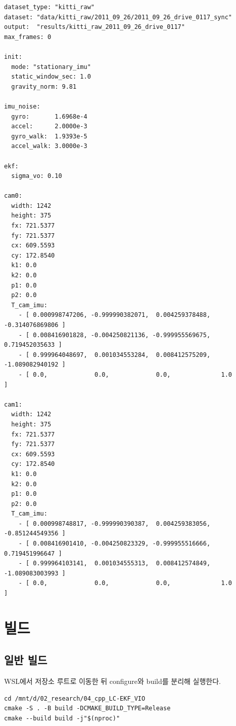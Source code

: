 \documentclass[11pt,a4paper,oneside]{report}
\begin{document}
\begin{lstlisting}[style=yaml,caption={저장소 루트 실행 기준 최소 예시}]
dataset_type: "kitti_raw"
dataset: "data/kitti_raw/2011_09_26/2011_09_26_drive_0117_sync"
output:  "results/kitti_raw_2011_09_26_drive_0117"
max_frames: 0

init:
  mode: "stationary_imu"
  static_window_sec: 1.0
  gravity_norm: 9.81

imu_noise:
  gyro:       1.6968e-4
  accel:      2.0000e-3
  gyro_walk:  1.9393e-5
  accel_walk: 3.0000e-3

ekf:
  sigma_vo: 0.10

cam0:
  width: 1242
  height: 375
  fx: 721.5377
  fy: 721.5377
  cx: 609.5593
  cy: 172.8540
  k1: 0.0
  k2: 0.0
  p1: 0.0
  p2: 0.0
  T_cam_imu:
    - [ 0.000998747206, -0.999990382071,  0.004259378488, -0.314076869806 ]
    - [ 0.008416901828, -0.004250821136, -0.999955569675,  0.719452035633 ]
    - [ 0.999964048697,  0.001034553284,  0.008412575209, -1.089082940192 ]
    - [ 0.0,             0.0,             0.0,              1.0             ]

cam1:
  width: 1242
  height: 375
  fx: 721.5377
  fy: 721.5377
  cx: 609.5593
  cy: 172.8540
  k1: 0.0
  k2: 0.0
  p1: 0.0
  p2: 0.0
  T_cam_imu:
    - [ 0.000998748817, -0.999990390387,  0.004259383056, -0.851244549356 ]
    - [ 0.008416901410, -0.004250823329, -0.999955516666,  0.719451996647 ]
    - [ 0.999964103141,  0.001034555313,  0.008412574849, -1.089083003993 ]
    - [ 0.0,             0.0,             0.0,              1.0             ]
\end{lstlisting}

\chapter{빌드}

\section{일반 빌드}

WSL에서 저장소 루트로 이동한 뒤 configure와 build를 분리해 실행한다.

\begin{lstlisting}[style=shell,caption={Release 빌드}]
cd /mnt/d/02_research/04_cpp_LC-EKF_VIO
cmake -S . -B build -DCMAKE_BUILD_TYPE=Release
cmake --build build -j"$(nproc)"
\end{lstlisting}
\end{document}
